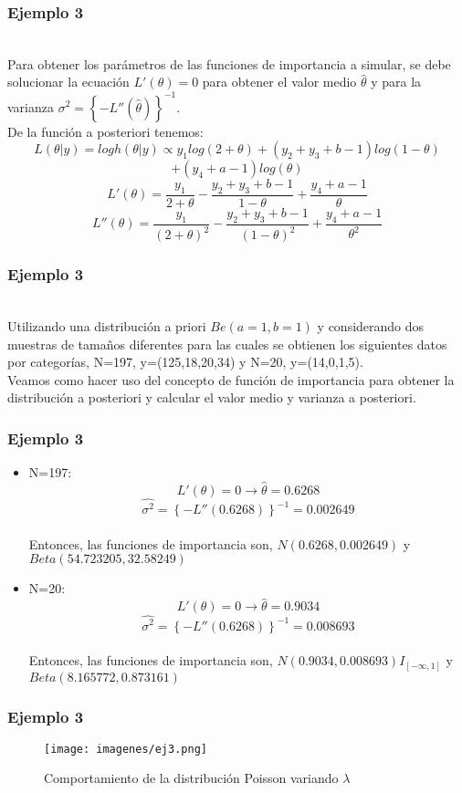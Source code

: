 \documentclass[12pt]{beamer}
\begin{document}
\begin{frame}
\frametitle{Ejemplo 3}
~\\Para obtener los parámetros de las funciones de importancia a simular, se debe solucionar la ecuación $L'(\theta)=0$ para obtener el valor medio $\hat{\theta}$ y  para la varianza $\sigma^2=\left\lbrace -L''(\hat{\theta})\right\rbrace ^{-1}$.
~\\De la función a posteriori tenemos:
$$L(\theta|y)=log h(\theta|y)\propto y_{1}log(2+\theta)+(y_{2}+y_{3}+b-1)log(1-\theta)$$
$$+(y_{4}+a-1)log(\theta)$$
$$L'(\theta)=\frac{y_{1}}{2+\theta}-\frac{y_{2}+y_{3}+b-1}{1-\theta}+\frac{y_{4}+a-1}{\theta}$$
$$L''(\theta)=\frac{y_{1}}{(2+\theta)^2}-\frac{y_{2}+y_{3}+b-1}{(1-\theta)^2}+\frac{y_{4}+a-1}{\theta^2}$$
\end{frame}

\begin{frame}
\frametitle{Ejemplo 3}
~\\Utilizando una distribución a priori $Be(a=1,b=1)$ y considerando dos muestras de tamaños diferentes para las cuales se obtienen los siguientes datos por categorías, N=197, y=(125,18,20,34) y N=20, y=(14,0,1,5).
~\\Veamos como hacer uso del concepto de función de importancia para obtener la distribución a posteriori y calcular el valor medio y varianza a posteriori.
\end{frame}

\begin{frame}
\frametitle{Ejemplo 3}
\begin{itemize}
\item N=197: $$L'(\theta)=0\rightarrow \hat{\theta}=0.6268$$
$$\hat{\sigma^2}=\left\lbrace -L''(0.6268) \right\rbrace ^{-1}=0.002649 $$
~\\Entonces, las funciones de importancia son, $N(0.6268,0.002649)$ y $Beta(54.723205,32.58249)$
\item N=20: $$L'(\theta)=0\rightarrow \hat{\theta}=0.9034$$
$$\hat{\sigma^2}=\left\lbrace -L''(0.6268) \right\rbrace ^{-1}=0.008693 $$
~\\Entonces, las funciones de importancia son, $N(0.9034,0.008693)I_{[-\infty,1]}$ y $Beta(8.165772,0.873161)$
\end{itemize}
\end{frame}

\begin{frame}
\frametitle{Ejemplo 3}
\begin{figure}[!h]
    \begin{center}
        \texttt{[image: imagenes/ej3.png]}
        \caption{Comportamiento de la distribución Poisson variando $\lambda$}
        \label{fig:Densidad}
    \end{center}
\end{figure}
\end{frame}
\end{document}
